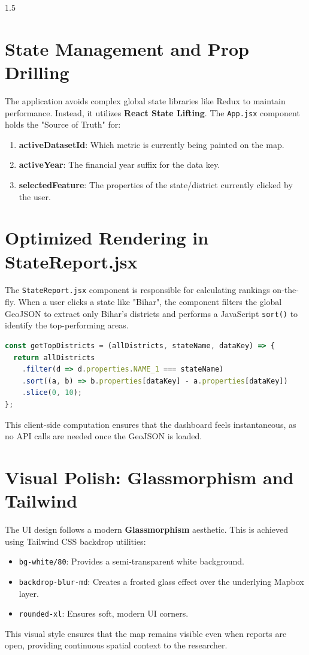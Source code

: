 \documentclass[12pt,a4paper]{report}
\begin{document}
\begin{spacing}{1.5}
\section{State Management and Prop Drilling}
The application avoids complex global state libraries like Redux to maintain performance. Instead, it utilizes \textbf{React State Lifting}. The \texttt{App.jsx} component holds the "Source of Truth" for:
\begin{enumerate}
    \item \textbf{activeDatasetId}: Which metric is currently being painted on the map.
    \item \textbf{activeYear}: The financial year suffix for the data key.
    \item \textbf{selectedFeature}: The properties of the state/district currently clicked by the user.
\end{enumerate}

\section{Optimized Rendering in StateReport.jsx}
The \texttt{StateReport.jsx} component is responsible for calculating rankings on-the-fly. When a user clicks a state like "Bihar", the component filters the global GeoJSON to extract only Bihar's districts and performs a JavaScript \texttt{sort()} to identify the top-performing areas.

\begin{lstlisting}[language=javascript, caption={On-the-fly District Ranking Logic}]
const getTopDistricts = (allDistricts, stateName, dataKey) => {
  return allDistricts
    .filter(d => d.properties.NAME_1 === stateName)
    .sort((a, b) => b.properties[dataKey] - a.properties[dataKey])
    .slice(0, 10);
};
\end{lstlisting}
This client-side computation ensures that the dashboard feels instantaneous, as no API calls are needed once the GeoJSON is loaded.

\section{Visual Polish: Glassmorphism and Tailwind}
The UI design follows a modern \textbf{Glassmorphism} aesthetic. This is achieved using Tailwind CSS backdrop utilities:
\begin{itemize}
    \item \texttt{bg-white/80}: Provides a semi-transparent white background.
    \item \texttt{backdrop-blur-md}: Creates a frosted glass effect over the underlying Mapbox layer.
    \item \texttt{rounded-xl}: Ensures soft, modern UI corners.
\end{itemize}
This visual style ensures that the map remains visible even when reports are open, providing continuous spatial context to the researcher.


\end{spacing}
\end{document}
